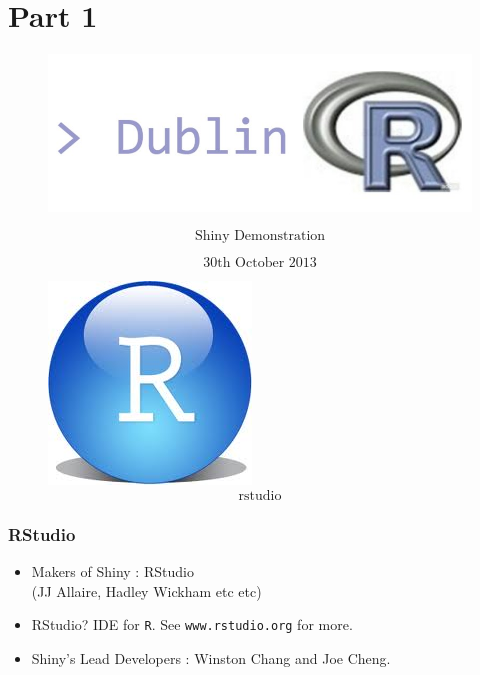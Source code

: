 \documentclass{beamer}
\begin{document}
\section{Part 1}

\begin{frame}
\begin{figure}
\vspace{1cm}
\centering
\includegraphics[width=0.7\linewidth]{./RlogoMAM}

\end{figure}
\LARGE
\[ \mbox{Shiny Demonstration}  \]
\Large


\[ \mbox{30th October 2013}  \]
\end{frame}
\begin{frame}
\begin{figure}
\Large
\centering
\includegraphics[width=0.55\linewidth]{./Rstudio}
\[ \mbox{rstudio}  \]
\end{figure}

\end{frame}
\begin{frame}
\frametitle{RStudio}
\LARGE
\begin{itemize}
\item Makers of Shiny : RStudio\\ (JJ Allaire, Hadley Wickham etc etc)
\item RStudio? IDE for \texttt{R}. See \texttt{www.rstudio.org} for more.
\item Shiny's  Lead Developers : Winston Chang and Joe Cheng.
\end{itemize}

\end{frame}
\end{document}
